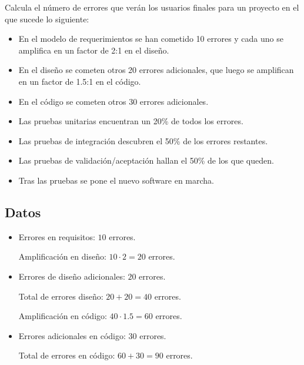 
\begin{enunciado}
    Calcula el número de errores que verán los usuarios finales para un proyecto en el que sucede lo siguiente:
    \begin{itemize}
        \item En el modelo de requerimientos se han cometido 10 errores y cada uno se amplifica en un factor de 2:1 en el diseño.
        \item En el diseño se cometen otros 20 errores adicionales, que luego se amplifican en un factor de 1.5:1 en el código.
        \item En el código se cometen otros 30 errores adicionales.
        \item Las pruebas unitarias encuentran un 20\% de todos los errores.
        \item Las pruebas de integración descubren el 50\% de los errores restantes.
        \item Las pruebas de validación/aceptación hallan el 50\% de los que queden.
        \item Tras las pruebas se pone el nuevo software en marcha.
    \end{itemize}
\end{enunciado}

\subsection{Datos}\label{subsec:datos}
\begin{itemize}
    \item Errores en requisitos: $10$ errores.

    Amplificación en diseño: $10 \cdot 2 = 20$ errores.


    \item Errores de diseño adicionales: $20$ errores.


    Total de errores diseño: $20 + 20 = 40$ errores.

    Amplificación en código: $40 \cdot 1.5 = 60$ errores.


    \item Errores adicionales en código: $30$ errores.

    Total de errores en código: $60 + 30 = 90$ errores.


\end{itemize}

\hrulefill

